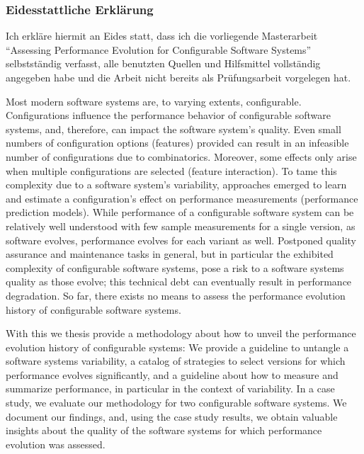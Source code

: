 \documentclass[
	12pt,
	a4paper,
	oneside,
	openright,
	listof=totoc%
]{scrbook}
\begin{document}

\newpage
\thispagestyle{empty}


 $$\qquad$$
 $$\qquad$$
 $$\qquad$$
 $$\qquad$$
 $$\qquad$$
 $$\qquad$$
 
\subsubsection*{Eidesstattliche Erklärung}
Ich erkläre hiermit an Eides statt, dass ich die vorliegende Masterarbeit
``Assessing Performance Evolution for Configurable Software Systems''
selbstständig verfasst, alle benutzten Quellen und Hilfsmittel vollständig
angegeben habe und die Arbeit nicht bereits als Prüfungsarbeit vorgelegen hat.

\vspace{1.3cm}



\clearpage
\setcounter{page}{1}

Most modern software systems are, to varying extents, configurable.
Configurations influence the performance behavior of configurable software
systems, and, therefore, can impact the software system’s quality. Even small
numbers of configuration options (features) provided can result in an
infeasible number of configurations due to combinatorics. Moreover, some
effects only arise when multiple configurations are selected (feature interaction).  To tame this complexity due
to a software system’s variability, approaches emerged to learn and estimate
a configuration’s effect on performance measurements (performance prediction
models). While performance of a configurable software system can be relatively
well understood with few sample measurements for a single version, as
software evolves, performance evolves for each variant as well. Postponed
quality assurance and maintenance tasks in general, but in particular the
exhibited complexity of configurable software systems, pose a risk to a
software systems quality as those evolve; this technical debt can eventually
result in performance degradation. So far, there exists no means to assess the
performance evolution history of configurable software systems.

With this we thesis provide a methodology about how to unveil the performance
evolution history of configurable systems: We provide a  guideline to untangle
a software systems variability, a catalog of strategies to select versions for
which performance evolves significantly, and a guideline about how to measure
and summarize performance, in particular in the context of variability. In a
case study, we evaluate our methodology for two configurable software systems. We document our
findings, and, using the case study results, we obtain valuable insights
about the quality of the software systems for which performance evolution was
assessed.
\end{document}
